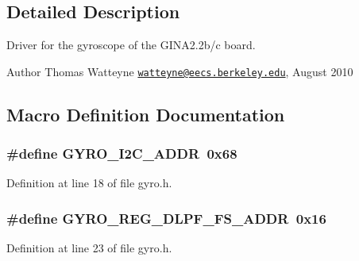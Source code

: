 \subsection{Detailed Description}
Driver for the gyroscope of the G\+I\+N\+A2.\+2b/c board. 

\begin{DoxyAuthor}{Author}
Thomas Watteyne \href{mailto:watteyne@eecs.berkeley.edu}{\tt watteyne@eecs.\+berkeley.\+edu}, August 2010 
\end{DoxyAuthor}


\subsection{Macro Definition Documentation}
\subsubsection[{\texorpdfstring{G\+Y\+R\+O\+\_\+\+I2\+C\+\_\+\+A\+D\+DR}{GYRO_I2C_ADDR}}]{\setlength{\rightskip}{0pt plus 5cm}\#define G\+Y\+R\+O\+\_\+\+I2\+C\+\_\+\+A\+D\+DR~0x68}\hypertarget{group___gyro_gad8d92e4df793131fb80295ae8ac32ebd}{}\label{group___gyro_gad8d92e4df793131fb80295ae8ac32ebd}


Definition at line 18 of file gyro.\+h.

\subsubsection[{\texorpdfstring{G\+Y\+R\+O\+\_\+\+R\+E\+G\+\_\+\+D\+L\+P\+F\+\_\+\+F\+S\+\_\+\+A\+D\+DR}{GYRO_REG_DLPF_FS_ADDR}}]{\setlength{\rightskip}{0pt plus 5cm}\#define G\+Y\+R\+O\+\_\+\+R\+E\+G\+\_\+\+D\+L\+P\+F\+\_\+\+F\+S\+\_\+\+A\+D\+DR~0x16}\hypertarget{group___gyro_gab4072c41c2a2593f97143fda49aba5ac}{}\label{group___gyro_gab4072c41c2a2593f97143fda49aba5ac}


Definition at line 23 of file gyro.\+h.


